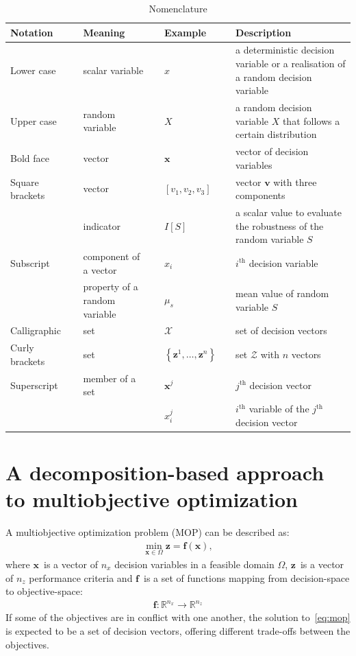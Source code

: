 \documentclass[a4paper]{article}
\newcommand{\brs}[1]{\left[{#1}\right]} %
\newcommand{\brr}[1]{{\left({#1}\right)}} %
\newcommand{\brf}[1]{\left\lbrace{#1}\right\rbrace} %
\newcommand{\I}[1]{\ensuremath{I\!\left[{#1}\right]}} %
\newcommand{\vx}{\ensuremath{\mathbf{x}}} %
\newcommand{\vf}{\ensuremath{\mathbf{f}}} %
\newcommand{\vz}{\ensuremath{\mathbf{z}}} %
\newcommand{\XSet}{\ensuremath{\mathcal{X}}} %
\newcommand{\ZSet}{\ensuremath{\mathcal{Z}}} %
\begin{document}
\begin{table}
\caption{Nomenclature}
\begin{tabular}{p{1.5cm}cp{2.5cm}cp{1.5cm}cp{3.5cm}} \toprule
{\bf Notation}	&& {\bf Meaning}					&& {\bf Example}				&& {\bf Description}											\\ \midrule
Lower case		&& scalar variable					&& $x$							&& a deterministic decision variable or a realisation of a random decision variable\\ \midrule
Upper case		&& random variable					&& $X$							&& a random decision variable $X$ that follows a certain distribution \\ \midrule
Bold face		&& vector							&& $\vx$						&& vector of decision variables									\\ \midrule
Square brackets && vector							&& $\brs{v_1,v_2,v_3}$			&& vector $\bm{v}$ with three components						\\
				&& indicator						&& $\I{S}$						&& a scalar value to evaluate the robustness of the random variable $S$	\\ \midrule
Subscript		&& component of a vector			&& $x_i$						&& $i^\text{th}$ decision variable								\\
				&& property of a random variable	&& $\mu_s$						&& mean value of random variable $S$							\\ \midrule
Calligraphic	&& set								&& $\XSet$						&& set of decision vectors										\\ \midrule
Curly brackets  && set								&& $\brf{\vz^1,\ldots,\vz^n}$	&& set $\ZSet$ with $n$ vectors									\\ \midrule
Superscript		&& member of a set					&& $\vx^j$						&& $j^\text{th}$ decision vector								\\
				&& 									&& $x^j_i$						&& $i^\text{th}$ variable of the $j^\text{th}$ decision vector	\\ 
\bottomrule
\end{tabular}
\label{tab:Nomenclature}
\end{table}

\section{A decomposition-based approach to multiobjective optimization}
\label{sec:Decomposition}
A multiobjective optimization problem (MOP) can be described as:
\begin{align}
\label{eq:mop}
	\min_{\vx\in\Omega} \vz=\vf\brr{\vx},
\end{align}
where \vx\ is a vector of $n_x$ decision variables in a feasible domain $\Omega$, \vz\ is a vector of $n_z$ performance criteria and \vf\ is a set of functions mapping from decision-space to objective-space:
\begin{align}
	\vf: \mathbb{R}^{n_x} \rightarrow \mathbb{R}^{n_z}
\end{align}
If some of the objectives are in conflict with one another, the solution to~\eqref{eq:mop} is expected to be a set of decision vectors, offering different trade-offs between the objectives.
\end{document}
